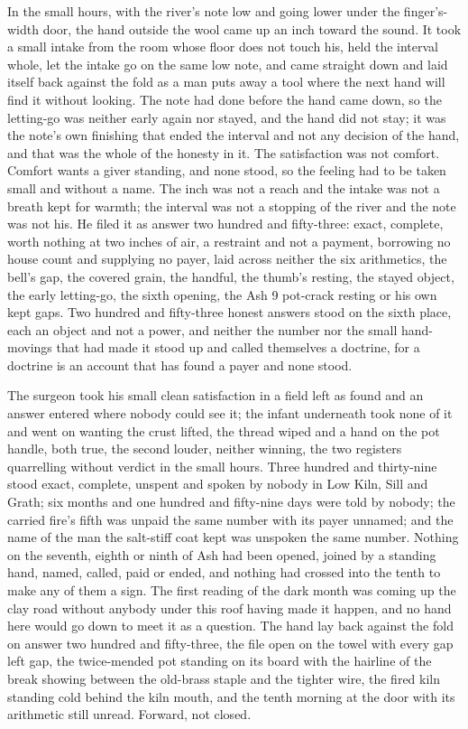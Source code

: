 In the small hours, with the river's note low and going lower under the finger's-width door, the hand outside the wool came up an inch toward the sound. It took a small intake from the room whose floor does not touch his, held the interval whole, let the intake go on the same low note, and came straight down and laid itself back against the fold as a man puts away a tool where the next hand will find it without looking. The note had done before the hand came down, so the letting-go was neither early again nor stayed, and the hand did not stay; it was the note's own finishing that ended the interval and not any decision of the hand, and that was the whole of the honesty in it. The satisfaction was not comfort. Comfort wants a giver standing, and none stood, so the feeling had to be taken small and without a name. The inch was not a reach and the intake was not a breath kept for warmth; the interval was not a stopping of the river and the note was not his. He filed it as answer two hundred and fifty-three: exact, complete, worth nothing at two inches of air, a restraint and not a payment, borrowing no house count and supplying no payer, laid across neither the six arithmetics, the bell's gap, the covered grain, the handful, the thumb's resting, the stayed object, the early letting-go, the sixth opening, the Ash 9 pot-crack resting or his own kept gaps. Two hundred and fifty-three honest answers stood on the sixth place, each an object and not a power, and neither the number nor the small hand-movings that had made it stood up and called themselves a doctrine, for a doctrine is an account that has found a payer and none stood.

The surgeon took his small clean satisfaction in a field left as found and an answer entered where nobody could see it; the infant underneath took none of it and went on wanting the crust lifted, the thread wiped and a hand on the pot handle, both true, the second louder, neither winning, the two registers quarrelling without verdict in the small hours. Three hundred and thirty-nine stood exact, complete, unspent and spoken by nobody in Low Kiln, Sill and Grath; six months and one hundred and fifty-nine days were told by nobody; the carried fire's fifth was unpaid the same number with its payer unnamed; and the name of the man the salt-stiff coat kept was unspoken the same number. Nothing on the seventh, eighth or ninth of Ash had been opened, joined by a standing hand, named, called, paid or ended, and nothing had crossed into the tenth to make any of them a sign. The first reading of the dark month was coming up the clay road without anybody under this roof having made it happen, and no hand here would go down to meet it as a question. The hand lay back against the fold on answer two hundred and fifty-three, the file open on the towel with every gap left gap, the twice-mended pot standing on its board with the hairline of the break showing between the old-brass staple and the tighter wire, the fired kiln standing cold behind the kiln mouth, and the tenth morning at the door with its arithmetic still unread. Forward, not closed.
